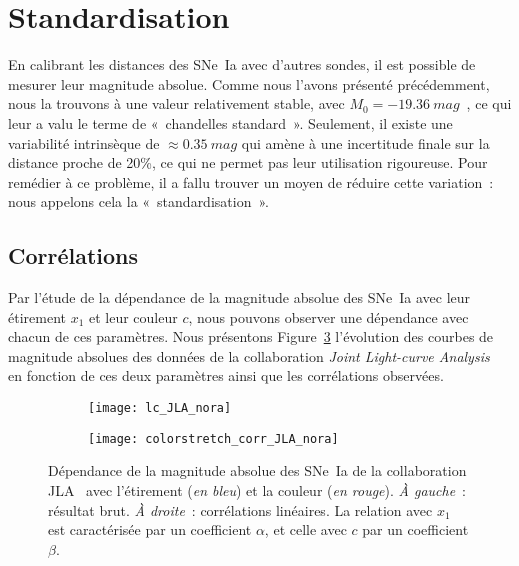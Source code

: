 \documentclass[../main/main.tex]{subfiles}
\begin{document}
\section{Standardisation}\label{sec:stand}

En calibrant les distances des SNe~Ia avec d'autres sondes, il est possible de
mesurer leur magnitude absolue. Comme nous l'avons présenté précédemment, nous
la trouvons à une valeur relativement stable, avec $M_0 =
-\SI{19.36}{mag}$~\citep{kessler2009b}, ce qui leur a valu le terme de
«~chandelles standard~». Seulement, il existe une variabilité intrinsèque de
$\approx \SI{0.35}{mag}$ qui amène à une incertitude finale sur la distance
proche de 20\%, ce qui ne permet pas leur utilisation rigoureuse. Pour remédier
à ce problème, il a fallu trouver un moyen de réduire cette variation~: nous
appelons cela la «~standardisation~».

\subsection{Corrélations}\label{ssec:corr}

Par l'étude de la dépendance de la magnitude absolue des SNe~Ia avec leur
étirement $x_1$ et leur couleur $c$, nous pouvons observer une dépendance
avec chacun de ces paramètres. Nous présentons Figure~\ref{fig:mxc} l'évolution
des courbes de magnitude absolues des données de la collaboration \textit{Joint
Light-curve Analysis}~\citep[JLA,][]{betoule2014} en fonction de ces deux
paramètres ainsi que les corrélations observées.

\begin{figure}[]
    \centering
    \begin{subfigure}[c]{.48\linewidth}
        \centering
        \texttt{[image: lc\_JLA\_nora]}
        \label{fig:mxca}
    \end{subfigure}
    \begin{subfigure}[c]{.48\linewidth}
        \centering
        \texttt{[image: colorstretch\_corr\_JLA\_nora]}
        \label{fig:mxcb}
    \end{subfigure}
    \caption[Dépendance de la magnitude absolue des SNe~Ia de la collaboration
    JLA avec l'étirement et la couleur]{Dépendance de la magnitude absolue des
        SNe~Ia de la collaboration JLA~\citep{betoule2014} avec l'étirement
        (\textit{en bleu}) et la couleur (\textit{en rouge}). \textit{À
        gauche}~: résultat brut. \textit{À droite}~: corrélations linéaires. La
        relation avec $x_1$ est caractérisée par un coefficient $\alpha$, et
    celle avec $c$ par un coefficient $\beta$.}\label{fig:mxc}
\end{figure}
\end{document}
